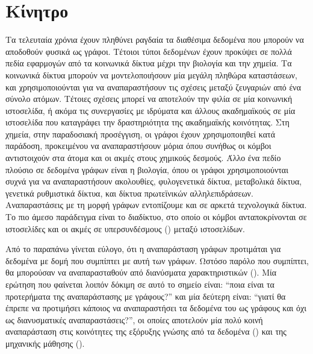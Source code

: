 \section{Κίνητρο}
Τα τελευταία χρόνια έχουν πληθύνει ραγδαία τα διαθέσιμα δεδομένα που μπορούν να αποδοθούν φυσικά ως γράφοι.
Τέτοιοι τύποι δεδομένων έχουν προκύψει σε πολλά πεδία εφαρμογών από τα κοινωνικά δίκτυα μέχρι την βιολογία και την χημεία. Τα κοινωνικά δίκτυα μπορούν να μοντελοποιήσουν μία μεγάλη πληθώρα καταστάσεων, και χρησιμοποιούνται για να αναπαραστήσουν τις σχέσεις μεταξύ ζευγαριών από ένα σύνολο ατόμων.
Τέτοιες σχέσεις μπορεί να αποτελούν την φιλία σε μία κοινωνική ιστοσελίδα, ή ακόμα τις συνεργασίες με ιδρύματα και άλλους ακαδημαϊκούς σε μία ιστοσελίδα που καταγράφει την δραστηριότητα της ακαδημαϊκής κοινότητας.
Στη χημεία, στην παραδοσιακή προσέγγιση, οι γράφοι έχουν χρησιμοποιηθεί κατά παράδοση, προκειμένου να αναπαραστήσουν μόρια όπου συνήθως οι κόμβοι αντιστοιχούν στα άτομα και οι ακμές στους χημικούς δεσμούς.
Άλλο ένα πεδίο πλούσιο σε δεδομένα γράφων είναι η βιολογία, όπου οι γράφοι χρησιμοποιούνται συχνά για να αναπαραστήσουν  ακολουθίες, φυλογενετικά δίκτυα, μεταβολικά δίκτυα, γενετικά ρυθμιστικά δίκτυα, και δίκτυα πρωτεϊνικών αλληλεπιδράσεων.
Αναπαραστάσεις με τη μορφή γράφων εντοπίζουμε και σε αρκετά τεχνολογικά δίκτυα.
Το πιο άμεσο παράδειγμα είναι το διαδίκτυο, στο οποίο οι κόμβοι ανταποκρίνονται σε ιστοσελίδες και οι ακμές σε υπερσυνδέσμους () μεταξύ ιστοσελίδων.\par
Από το παραπάνω γίνεται εύλογο, ότι η αναπαράσταση γράφων προτιμάται για δεδομένα με δομή που συμπίπτει με αυτή των γράφων.
Ωστόσο παρόλο που συμπίπτει, θα μπορούσαν να αναπαρασταθούν από διανύσματα χαρακτηριστικών ().
Μία ερώτηση που φαίνεται λοιπόν δόκιμη σε αυτό το σημείο είναι: ``ποια είναι τα προτερήματα της αναπαράστασης με γράφους?'' και μία δεύτερη είναι: ``γιατί θα έπρεπε να προτιμήσει κάποιος να αναπαραστήσει τα δεδομένα του ως γράφους και όχι ως διανυσματικές αναπαραστάσεις?'', οι οποίες αποτελούν μία πολύ κοινή αναπαράσταση στις κοινότητες της εξόρυξης γνώσης από τα δεδομένα () και της μηχανικής μάθησης ().
